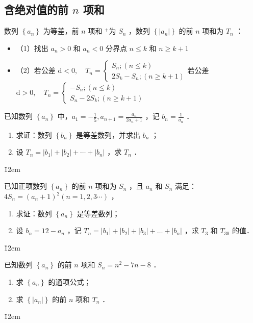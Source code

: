\vspace{10em}

\subsection{含绝对值的前 $n$ 项和}

\begin{theorem}[等差数列中含绝对值的前 $n$ 项和]
    数列 $\left\{a_n\right\}$ 为等差，前 $n$ 项和 ${ }^{+}$为 $S_n$ ，数列 $\left\{\left|a_n\right|\right\}$ 的前 $n$ 项和为 $T_n$ ：
    \begin{itemize}
        \item （1）找出 $a_n>0$ 和 $a_n<0$ 分界点 $n \leq k$ 和 $n \geq k+1$
        \item （2）若公差 $\mathrm{d}<0, \quad T_n=\left\{\begin{array}{l}S_n ;(n \leq k) \\ 2 S_k-S_n ;(n \geq k+1)\end{array}\right.$若公差 $\mathrm{d}>0, \quad T_n=\left\{\begin{array}{l}-S_n ;(n \leq k) \\ S_n-2 S_k ;(n \geq k+1)\end{array}\right.$
    \end{itemize}
\end{theorem}

\begin{example}
    已知数列 $\left\{a_n\right\}$ 中，$a_1=-\frac{1}{5}, a_{n+1}=\frac{a_n}{2 a_n+1}$ ，记 $b_n=\frac{1}{a_n}$ ．
    \begin{enumerate}
        \item 求证：数列 $\left\{b_n\right\}$ 是等差数列，并求出 $b_n$ ；
        \item 设 $T_n=\left|b_1\right|+\left|b_2\right|+\cdots+\left|b_n\right|$ ，求 $T_n$ ．
    \end{enumerate}
\end{example}

\v{12em}

\begin{example}
    已知正项数列 $\left\{a_n\right\}$ 的前 $n$ 项和为 $S_n$ ，且 $a_n$ 和 $S_n$ 满足： $4 S_n=\left(a_n+1\right)^2(n=1,2,3 \cdots)$ ，
    \begin{enumerate}
        \item 求证：数列 $\left\{a_n\right\}$ 是等差数列；
        \item 设 $b_n=12-a_n$ ，记 $T_n=\left|b_1\right|+\left|b_2\right|+\left|b_3\right|+\ldots+\left|b_n\right|$ ，求 $T_3$ 和 $T_{30}$ 的值．
    \end{enumerate}
\end{example}

\v{12em}

\begin{example}
    已知数列 $\left\{a_n\right\}$ 的前 $n$ 项和 $S_n=n^2-7 n-8$ ．
    \begin{enumerate}
        \item 求 $\left\{a_n\right\}$ 的通项公式；
        \item 求 $\left\{\left|a_n\right|\right\}$ 的前 $n$ 项和 $T_n$ ．
    \end{enumerate}
\end{example}

\v{12em}
